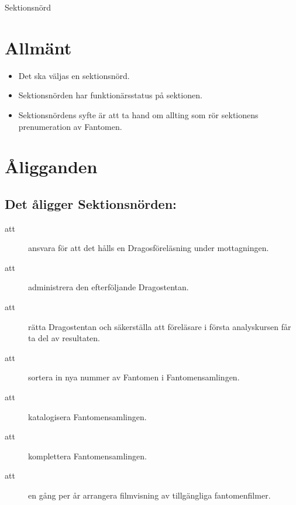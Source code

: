 \documentclass[a4paper]{article}
\begin{document}
\renewcommand{\forening}{Sektionsnörd} %

\begin{foreningenv}{\forening{}} %
    \section{Allmänt}
    \begin{itemize}
        \item Det ska väljas en sektionsnörd.
        \item Sektionsnörden har funktionärsstatus på sektionen.
        \item Sektionsnördens syfte är att ta hand om allting som rör sektionens prenumeration av Fantomen.
    \end{itemize}
    
    \section{Åligganden}
    \aliggsektfunkt{}
    
    \subsection{Det åligger Sektionsnörden:}
    \begin{description}
        \item[att] ansvara för att det hålls en Dragosföreläsning under mottagningen.
        \item[att] administrera den efterföljande Dragostentan.
        \item[att] rätta Dragostentan och säkerställa att föreläsare i första analyskursen får ta del av resultaten.
        \item[att] sortera in nya nummer av Fantomen i Fantomensamlingen.
        \item[att] katalogisera Fantomensamlingen.
        \item[att] komplettera Fantomensamlingen.
        \item[att] en gång per år arrangera filmvisning av tillgängliga fantomenfilmer.
    \end{description}
\end{foreningenv}
\end{document}
